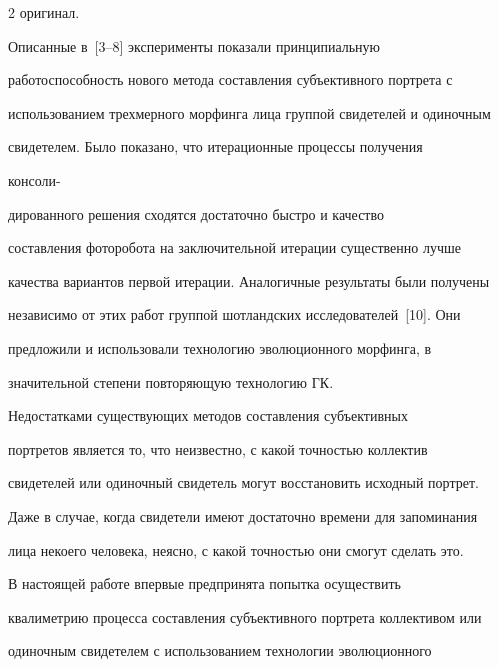 \begin{multicols}{2}
оригинал. 


     


     Описанные в~[3--8] эксперименты показали принципиальную 


работоспособность нового метода составления субъективного портрета с 


использованием трехмерного морфинга лица группой свидетелей и одиночным 


свидетелем. Было показано, что итерационные процессы получения 


консоли-\linebreak\vspace*{-12pt}


\pagebreak





\noindent


дированного решения сходятся достаточно быстро и качество 


составления фоторобота на заключительной итерации существенно лучше 


качества вариантов первой итерации. Аналогичные результаты были получены 


независимо от этих работ группой шотландских исследователей~[10]. Они 


предложили и использовали технологию эволюционного морфинга, в 


значительной степени повторяющую технологию ГК. 


     


     Недостатками существующих методов составления субъективных 


портретов является то, что неизвестно, с какой точностью коллектив 


свидетелей или одиночный свидетель могут восстановить исходный портрет. 


Даже в случае, когда свидетели имеют достаточно времени для запоминания 


лица некоего человека, неясно, с какой точностью они смогут сделать это. 


     


      В настоящей работе впервые предпринята попытка осуществить 


квалиметрию процесса со\-ставления субъективного портрета коллективом или 


одиночным свидетелем с использованием технологии эволюционного 



\end{multicols}
